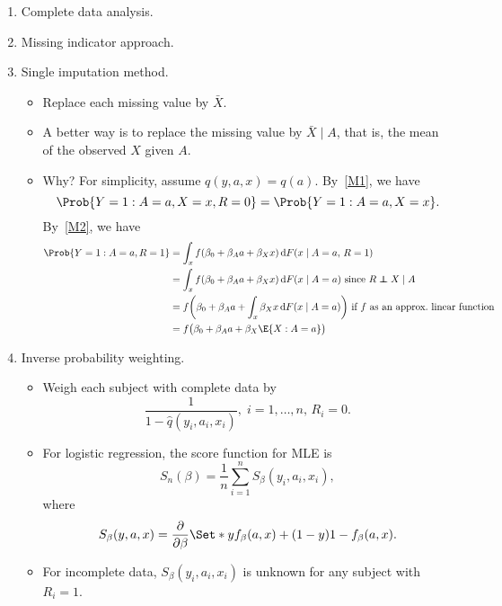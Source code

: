 \begin{enumerate}
      \item Complete data analysis.
      \item Missing indicator approach.
      \item Single imputation method.
            \begin{itemize}
                  \item Replace each missing value by $ \bar{X} $.
                  \item A better way is to replace the missing value by $ \bar{X}\mid A $, that is,
                        the mean of the observed $ X $ given $ A $.
                  \item Why? For simplicity, assume $ q(y,a,x)=q(a) $. By~\ref{M1}, we have
                        \[ \Prob{Y=1\given A=a,X=x,R=0}=\Prob{Y=1\given A=a,X=x}. \]
                        By~\ref{M2}, we have
                        \begin{align*}
                              \Prob{Y=1\given A=a,R=1}
                               & =\int_{x}f(\beta_0+\beta_A a+\beta_X x)\odif{F(x\mid A=a\text{$,$ }R=1)}                                            \\
                               & =\int_{x}f(\beta_0+\beta_A a+\beta_X x)\odif{F(x\mid A=a)}\text{ since $R\indep X\mid A$}                           \\
                               & =f\biggl(\beta_0+\beta_A a+\int_{x}\beta_X x\odif{F(x\mid A=a)}\biggr)\text{ if $f$ as an approx.\ linear function} \\
                               & =f\bigl(\beta_0+\beta_A a+\beta_X\E{X\given A=a}\bigr)
                        \end{align*}
            \end{itemize}
      \item Inverse probability weighting.
            \begin{itemize}
                  \item Weigh each subject with complete data by
                        \[ \frac{1}{1-\hat{q}(y_i,a_i,x_i)},\; i=1,\ldots,n,\, R_i=0. \]
                  \item For logistic regression, the score function for MLE is
                        \[ S_n(\beta)=\frac{1}{n}\sum_{i=1}^{n}S_\beta(y_i,a_i,x_i), \]
                        where
                        \[ S_\beta(y,a,x)=\pdv*{\Set*{y\log{f_\beta(a,x)}+(1-y)\log{1-f_\beta(a,x)}}}{\beta}. \]
                  \item For incomplete data, $ S_\beta(y_i,a_i,x_i) $ is unknown for any subject with $ R_i=1 $.

\end{itemize}
\end{enumerate}
